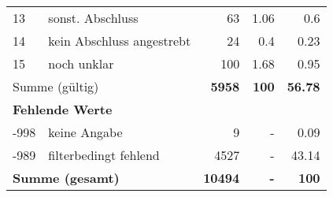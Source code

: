 \begin{longtable}{lXrrr}
     13 &
     \multicolumn{1}{X}{ sonst. Abschluss   } &


       \num{63} &
       \num[round-mode=places,round-precision=2]{1.06} &
         \num[round-mode=places,round-precision=2]{0.6} \\

     14 &
     \multicolumn{1}{X}{ kein Abschluss angestrebt   } &


       \num{24} &
       \num[round-mode=places,round-precision=2]{0.4} &
         \num[round-mode=places,round-precision=2]{0.23} \\

     15 &
     \multicolumn{1}{X}{ noch unklar   } &


       \num{100} &
       \num[round-mode=places,round-precision=2]{1.68} &
         \num[round-mode=places,round-precision=2]{0.95} \\
     \midrule
     \multicolumn{2}{l}{Summe (gültig)} &
       \textbf{\num{5958}} &
     \textbf{\num{100}} &
       \textbf{\num[round-mode=places,round-precision=2]{56.78}} \\
     \multicolumn{5}{l}{\textbf{Fehlende Werte}}\\
       -998 &
       keine Angabe &
         \num{9} &
        - &
         \num[round-mode=places,round-precision=2]{0.09} \\
       -989 &
       filterbedingt fehlend &
         \num{4527} &
        - &
         \num[round-mode=places,round-precision=2]{43.14} \\
     \midrule
     \multicolumn{2}{l}{\textbf{Summe (gesamt)}} &
          \textbf{\num{10494}} &
        \textbf{-} &
        \textbf{\num{100}} \\
     \bottomrule
     \end{longtable}
     
